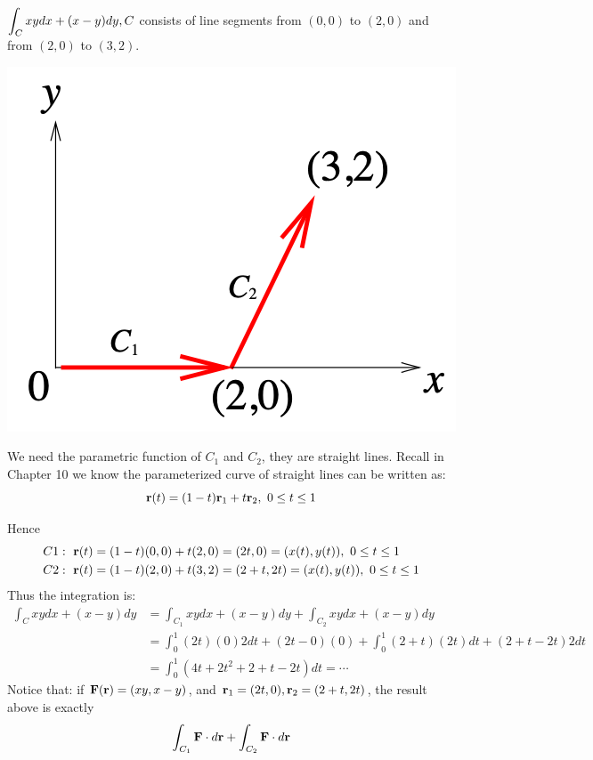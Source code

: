 \begin{spacing}{1.3}
    \eg $\displaystyle \int_{C} x y d x+(x-y) d y, C$ consists of line segments from $(0,0)$ to $(2,0)$ and from $(2,0)$ to $(3,2)$.
    \begin{center}
        \includegraphics[scale=0.50]{images/Ch15-wrt-eg1.png}
    \end{center}

    \sol We need the parametric function of $C_1$ and $C_2$, they are straight lines.
    Recall in Chapter 10 we know the parameterized curve of straight lines can be written as: 
    $${\bf r}(t)=(1-t){\bf r}_1+t{\bf r}_2, \ 0\le t\le 1$$

    Hence 
    \begin{align*}
        C1: \ {\bf r}(t) &= (1-t)(0, 0) + t(2, 0) = (2t, 0) = (x(t), y(t)),\ 0\le t\le 1\\
        C2: \ {\bf r}(t) &= (1-t)(2, 0) + t(3, 2) = (2+t, 2t) = (x(t), y(t)),\ 0\le t\le 1
    \end{align*}
    Thus the integration is: 
    \begin{align*}
        \int_C xydx+(x-y)dy &= \int_{C_1} xydx+(x-y)dy + \int_{C_2} xydx+(x-y)dy\\
                    &= \int_0^1 (2t)(0) 2dt+(2t-0)(0) +\int_0^1 (2+t)(2t)dt + (2+t-2t) 2dt\\
                    &= \int_0^1 (4t+2t^2+2+t-2t) dt =\cdots
    \end{align*}
    {\blue Notice that: } if ${\bf F}({\bf r})=(xy, x-y)$, and ${\bf r}_1=(2t, 0), {\bf r}_2=(2+t,2t)$, 
    the result above is exactly 
    $$\int_{C_1} {\bf F}\cdot d{\bf r} + \int_{C_2} {\bf F}\cdot d{\bf r}$$


\end{spacing}
